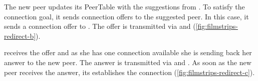 The new peer updates its PeerTable with the suggestions from \alice. To satisfy the connection goal, it sends connection offers to the suggested peer. In this case, it sends a connection offer to \claire. The offer is transmitted via \signal and \alice (\vref{fig:filmstrips-redirect-b}). 

\claire receives the offer and as she has one connection available she is sending back her answer to the new peer. The answer is transmitted via \alice and \signal. As soon as the new peer receives the answer, its establishes the connection (\vref{fig:filmstrips-redirect-c}).
